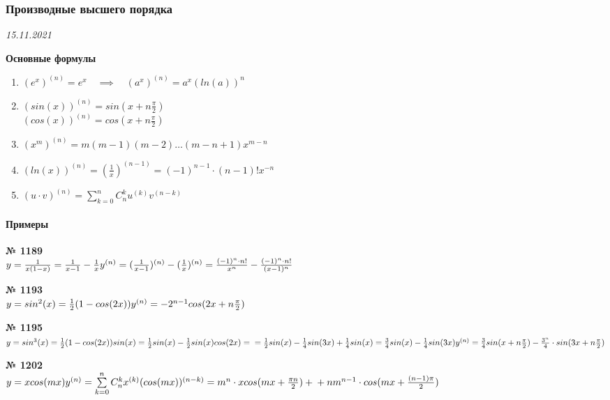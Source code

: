 \documentclass[12pt]{article}
\newenvironment{task}[1][0]{\vspace{.5cm} {\textbf{№ #1} \vspace{.5cm}\\ }\large}{}
\begin{document}
{\subsubsection{Производные высшего порядка}
{\hfill \textit{15.11.2021}}

{\hfill \textbf{Основные формулы} \hfill}

\begin{enumerate}
	\item {
$(e^x)^{(n)}=e^x \quad \implies \quad (a^x)^{(n)}=a^x(ln(a))^n$	
}
	\item{
$
(sin(x))^{(n)}=sin(x+n \frac{\pi}{2})$\\
$(cos(x))^{(n)}=cos(x+n \frac{\pi}{2})$
}
\item{
$(x^m)^{(n)}=m(m-1)(m-2)\ldots(m-n+1)x^{m-n}$
}
\item{
$(ln(x))^{(n)}=(\frac{1}{x})^{(n-1)}=(-1)^{n-1} \cdot (n-1)! x^{-n}$
}
\item{
$(u \cdot v)^{(n)}=\sum\limits_{k=0}^n C_n^k u^{(k)}v^{(n-k)}$\\
}
\end{enumerate}

\paragraph{Примеры\vspace{.5cm}\\}

\begin{task}[1189]
$y=\frac{1}{x(1-x)}=\frac{1}{x-1}-\frac{1}{x}\\
y^{(n)}=(\frac{1}{x-1})^{(n)}-(\frac{1}{x})^{(n)}= \frac{(-1)^n \cdot n!}{x^n}-\frac{(-1)^n \cdot n!}{(x-1)^n}$
\end{task}

\begin{task}[1193]
$y=sin^2(x)=\frac{1}{2}(1-cos(2x))\\
y^{(n)}=-2^{n-1}cos(2x+n\frac{\pi}{2})$
\end{task}

\begin{task}[1195]
$y=sin^3(x)=\frac{1}{2}(1-cos(2x))sin(x)=\frac{1}{2}sin(x)-\frac{1}{2}sin(x)cos(2x)=\\=\frac{1}{2}sin(x)-\frac{1}{4}sin(3x)+\frac{1}{4}sin(x)=\frac{3}{4}sin(x)-\frac{1}{4}sin(3x)\\
y^{(n)}=\frac{3}{4}sin(x+n\frac{\pi}{2})-\frac{3^n}{4}\cdot sin(3x+n\frac{\pi}{2})$
\end{task}

\begin{task}[1202]
$y=xcos(mx)\\
y^{(n)}=\sum\limits_{k=0}^n C_n^k x^{(k)}(cos(mx))^{(n-k)}=m^n \cdot xcos(mx+\frac{\pi n}{2}) +\\+ nm^{n-1} \cdot cos(mx+\frac{(n-1)\pi}{2})$
\end{task}

}
\end{document}

